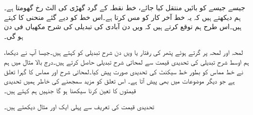 جیسے جیسے  کو بائیں منتقل کیا جائے، خط  نقطہ  کے گرد گھڑی کی الٹ رخ گھومتا ہے۔ہم دیکھتے ہیں کہ یہ خط آخر کار  کو مس کرتا ہے۔اس خط کو دیے گئے منحنی کا  کہتے ہیں۔اس طرح ہم توقع کرتے ہیں کہ  ویں دن آبادی کی تبدیلی کی شرح  مکھیاں فی دن ہو گی۔

لمحہ  اور لمحہ  پر گرتے ہوئے پتھر کی رفتار یا  ویں دن شرح تبدیلی کو  کہتے ہیں۔جیسا آپ نے دیکھا، ہم اوسط شرح تبدیلی کی تحدیدی قیمت سے لمحاتی شرح تبدیلی حاصل کرتے ہیں۔درج بالا مثال میں ہم نے خط مماس کو بطور خط سیکنٹ کی تحدیدی  صورت پیش کیا۔لمحاتی شرح اور مماس کا گہرا تعلق ہے جو دیگر موضوعات میں بھی پیش آتا ہے۔ اس تعلق کو مزید سمجھنے کی خاطر ہمیں  تحدیدی قیمتوں  کا تعین کرنا سیکھنا ہو گا جنہیں ہم  کہتے ہیں۔ 

تحدیدی قیمت کی تعریف سے پہلی ایک اور مثال دیکھتے ہیں۔

